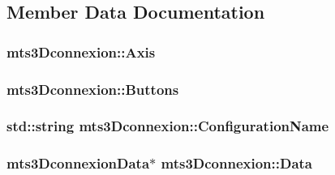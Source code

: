\subsection{Member Data Documentation}
\hypertarget{classmts3_dconnexion_aef658870f656a1ccb93a065d74d74e4b}{
\subsubsection[{Axis}]{ mts3\-Dconnexion\-::\-Axis\hspace{0.3cm}{\ttfamily [protected]}}}\label{classmts3_dconnexion_aef658870f656a1ccb93a065d74d74e4b}
\hypertarget{classmts3_dconnexion_a8fc19fc124985d015c53b9580ca7355f}{
\subsubsection[{Buttons}]{ mts3\-Dconnexion\-::\-Buttons\hspace{0.3cm}{\ttfamily [protected]}}}\label{classmts3_dconnexion_a8fc19fc124985d015c53b9580ca7355f}
\hypertarget{classmts3_dconnexion_af68f59f690ccf2fd198b90eedae0e769}{
\subsubsection[{Configuration\-Name}]{\setlength{\rightskip}{0pt plus 5cm}std\-::string mts3\-Dconnexion\-::\-Configuration\-Name\hspace{0.3cm}{\ttfamily [protected]}}}\label{classmts3_dconnexion_af68f59f690ccf2fd198b90eedae0e769}
\hypertarget{classmts3_dconnexion_af6ca74b9b8dd0a73f56cc7d0eab06fc4}{
\subsubsection[{Data}]{\setlength{\rightskip}{0pt plus 5cm}mts3\-Dconnexion\-Data$\ast$ mts3\-Dconnexion\-::\-Data\hspace{0.3cm}{\ttfamily [protected]}}}\label{classmts3_dconnexion_af6ca74b9b8dd0a73f56cc7d0eab06fc4}
